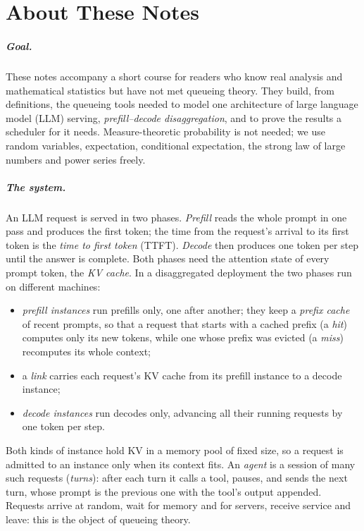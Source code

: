 \chapter*{About These Notes}

\paragraph{Goal.} These notes accompany a short course for readers who know real
analysis and mathematical statistics but have not met queueing theory. They build,
from definitions, the queueing tools needed to model one architecture of large
language model (LLM) serving, \emph{prefill--decode disaggregation}, and to prove the
results a scheduler for it needs. Measure-theoretic probability is not needed; we use
random variables, expectation, conditional expectation, the strong law of large
numbers and power series freely.

\paragraph{The system.} An LLM request is served in two phases. \emph{Prefill} reads
the whole prompt in one pass and produces the first token; the time from the
request's arrival to its first token is the \emph{time to first token} (TTFT).
\emph{Decode} then produces one token per step until the answer is complete. Both
phases need the attention state of every prompt token, the \emph{KV cache}. In a
disaggregated deployment the two phases run on different machines:
\begin{itemize}
\item \emph{prefill instances} run prefills only, one after another; they keep a
  \emph{prefix cache} of recent prompts, so that a request that starts with a cached
  prefix (a \emph{hit}) computes only its new tokens, while one whose prefix was
  evicted (a \emph{miss}) recomputes its whole context;
\item a \emph{link} carries each request's KV cache from its prefill instance to a
  decode instance;
\item \emph{decode instances} run decodes only, advancing all their running requests
  by one token per step.
\end{itemize}
Both kinds of instance hold KV in a memory pool of fixed size, so a request is admitted
to an instance only when its context fits. An \emph{agent} is a session of many such
requests (\emph{turns}): after each turn it calls a tool, pauses, and sends the next
turn, whose prompt is the previous one with the tool's output appended. Requests
arrive at random, wait for memory and for servers, receive service and leave: this is
the object of queueing theory.

